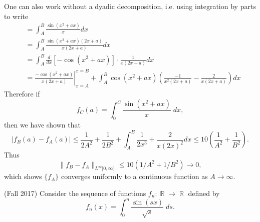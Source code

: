\documentclass[answers]{exam}
\DeclareMathOperator{\RR}{\mathbb{R}}
\theoremstyle{problemstyle}
\newcommand{\1}[1]{\textbf{1}_{\left[#1\right]}} %
\begin{document}
\begin{questions}
\begin{solution}
	One can also work without a dyadic decomposition, i.e. using integration by parts to write
  \begin{align*}
      &= \int_{A}^{B}\frac{\sin(x^{2}+ax)}{x}dx\\ 
      &= \int_{A}^{B}\frac{\sin(x^{2}+ax)(2x+a)}{x(2x+a)}dx\\
      &= \int_{A}^{B} \frac{d}{dx}\left[ -\cos(x^{2}+ax) \right] \cdot \frac{1}{x(2x+a)}dx\\
      &= \left.\frac{-\cos(x^{2}+ax)}{x(2x+a)}\right|^{x=B}_{x=A} + \int_{A}^{B}\cos(x^{2}+ax)\left( \frac{-1}{x^{2}(2x+a)}-\frac{2}{x(2x+a)} \right)  dx
    \end{align*}
    Therefore if
    \[ f_C(a) = \int_0^C \frac{\sin(x^2 + ax)}{x}\; dx, \]
    then we have shown that
    \begin{equation*}
      \left|   f_{B}(a)-f_{A}(a) \right|
      \leq \frac{1}{2A^{2}}+ \frac{1}{2B^{2}} + \int_{A}^{B}\frac{1}{2x^{3}}+ \frac{2}{x(2x)^{2}} dx
      \leq 10 \left( \frac{1}{A^{2}}+\frac{1}{B^{2}}  \right).
    \end{equation*}
    Thus
    \[ \| f_B - f_A \|_{L^\infty[0,\infty)} \leq 10 (1/A^2 + 1/B^2) \to 0, \]
    which shows $\{ f_A \}$ converges uniformly to a continuous function as $A \to \infty$.
\end{solution}

\question (Fall 2017) Consider the sequence of functions $f_n: \RR \to \RR$ defined by
%
\[ f_n(x) = \int_0^n \frac{\sin(sx)}{\sqrt{s}}\; ds. \]
%
\end{questions}
\end{document}
